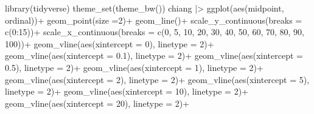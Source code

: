 \documentclass[
  letterpaper,
  DIV=11,
  numbers=noendperiod]{scrreprt}
\newenvironment{Shaded}{\begin{snugshade}}{\end{snugshade}}
\newcommand{\AttributeTok}[1]{\textcolor[rgb]{0.40,0.45,0.13}{#1}}
\newcommand{\DecValTok}[1]{\textcolor[rgb]{0.68,0.00,0.00}{#1}}
\newcommand{\FloatTok}[1]{\textcolor[rgb]{0.68,0.00,0.00}{#1}}
\newcommand{\FunctionTok}[1]{\textcolor[rgb]{0.28,0.35,0.67}{#1}}
\newcommand{\NormalTok}[1]{\textcolor[rgb]{0.00,0.23,0.31}{#1}}
\newcommand{\SpecialCharTok}[1]{\textcolor[rgb]{0.37,0.37,0.37}{#1}}
\begin{document}
\begin{Shaded}
\begin{Highlighting}[]
\FunctionTok{library}\NormalTok{(tidyverse)}
\FunctionTok{theme\_set}\NormalTok{(}\FunctionTok{theme\_bw}\NormalTok{())}
\NormalTok{chiang }\SpecialCharTok{|\textgreater{}} 
  \FunctionTok{ggplot}\NormalTok{(}\FunctionTok{aes}\NormalTok{(midpoint, ordinal))}\SpecialCharTok{+}
  \FunctionTok{geom\_point}\NormalTok{(}\AttributeTok{size =}\DecValTok{2}\NormalTok{)}\SpecialCharTok{+}
  \FunctionTok{geom\_line}\NormalTok{()}\SpecialCharTok{+}
  \FunctionTok{scale\_y\_continuous}\NormalTok{(}\AttributeTok{breaks =} \FunctionTok{c}\NormalTok{(}\DecValTok{0}\SpecialCharTok{:}\DecValTok{15}\NormalTok{))}\SpecialCharTok{+}
  \FunctionTok{scale\_x\_continuous}\NormalTok{(}\AttributeTok{breaks =} \FunctionTok{c}\NormalTok{(}\DecValTok{0}\NormalTok{, }\DecValTok{5}\NormalTok{, }\DecValTok{10}\NormalTok{, }\DecValTok{20}\NormalTok{, }\DecValTok{30}\NormalTok{, }\DecValTok{40}\NormalTok{, }\DecValTok{50}\NormalTok{, }\DecValTok{60}\NormalTok{, }\DecValTok{70}\NormalTok{, }\DecValTok{80}\NormalTok{, }\DecValTok{90}\NormalTok{, }\DecValTok{100}\NormalTok{))}\SpecialCharTok{+}
  \FunctionTok{geom\_vline}\NormalTok{(}\FunctionTok{aes}\NormalTok{(}\AttributeTok{xintercept =} \DecValTok{0}\NormalTok{), }\AttributeTok{linetype =} \DecValTok{2}\NormalTok{)}\SpecialCharTok{+}
  \FunctionTok{geom\_vline}\NormalTok{(}\FunctionTok{aes}\NormalTok{(}\AttributeTok{xintercept =} \FloatTok{0.1}\NormalTok{), }\AttributeTok{linetype =} \DecValTok{2}\NormalTok{)}\SpecialCharTok{+}
  \FunctionTok{geom\_vline}\NormalTok{(}\FunctionTok{aes}\NormalTok{(}\AttributeTok{xintercept =} \FloatTok{0.5}\NormalTok{), }\AttributeTok{linetype =} \DecValTok{2}\NormalTok{)}\SpecialCharTok{+}
  \FunctionTok{geom\_vline}\NormalTok{(}\FunctionTok{aes}\NormalTok{(}\AttributeTok{xintercept =} \DecValTok{1}\NormalTok{), }\AttributeTok{linetype =} \DecValTok{2}\NormalTok{)}\SpecialCharTok{+}
  \FunctionTok{geom\_vline}\NormalTok{(}\FunctionTok{aes}\NormalTok{(}\AttributeTok{xintercept =} \DecValTok{2}\NormalTok{), }\AttributeTok{linetype =} \DecValTok{2}\NormalTok{)}\SpecialCharTok{+}
  \FunctionTok{geom\_vline}\NormalTok{(}\FunctionTok{aes}\NormalTok{(}\AttributeTok{xintercept =} \DecValTok{5}\NormalTok{), }\AttributeTok{linetype =} \DecValTok{2}\NormalTok{)}\SpecialCharTok{+}
  \FunctionTok{geom\_vline}\NormalTok{(}\FunctionTok{aes}\NormalTok{(}\AttributeTok{xintercept =} \DecValTok{10}\NormalTok{), }\AttributeTok{linetype =} \DecValTok{2}\NormalTok{)}\SpecialCharTok{+}
  \FunctionTok{geom\_vline}\NormalTok{(}\FunctionTok{aes}\NormalTok{(}\AttributeTok{xintercept =} \DecValTok{20}\NormalTok{), }\AttributeTok{linetype =} \DecValTok{2}\NormalTok{)}\SpecialCharTok{+}

\end{Highlighting}
\end{Shaded}
\end{document}
